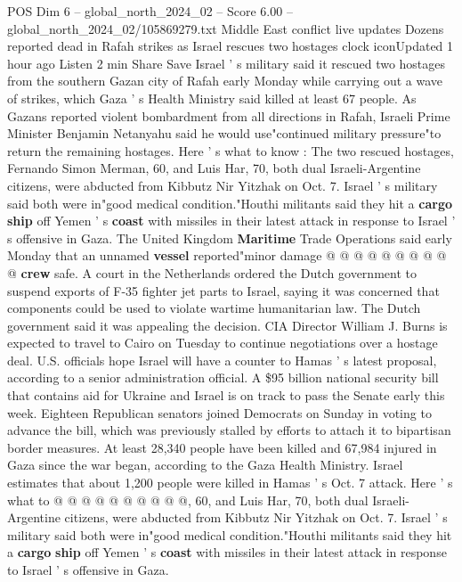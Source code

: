 \begin{textsample}{POS Dim 6 – global\_north\_2024\_02 – Score 6.00 – global\_north\_2024\_02/105869279.txt}  \label{ex:f6_pos_179}
Middle East conflict live updates Dozens reported dead in Rafah strikes as Israel rescues two hostages clock iconUpdated 1 hour ago Listen 2 min Share Save Israel ' s military said it rescued two hostages from the southern Gazan city of Rafah early Monday while carrying out a wave of strikes, which Gaza ' s Health Ministry said killed at least 67 people.
As Gazans reported violent bombardment from all directions in Rafah, Israeli Prime Minister Benjamin Netanyahu said he would use"continued military pressure"to return the remaining hostages.
Here ' s what to know : The two rescued hostages, Fernando Simon Merman, 60, and Luis Har, 70, both dual Israeli-Argentine citizens, were abducted from Kibbutz Nir Yitzhak on Oct. 7.
Israel ' s military said both were in"good medical condition."Houthi militants said they hit a \textbf{cargo} \textbf{ship} off Yemen ' s \textbf{coast} with missiles in their latest attack in response to Israel ' s offensive in Gaza.
The United Kingdom \textbf{Maritime} Trade Operations said early Monday that an unnamed \textbf{vessel} reported"minor damage @ @ @ @ @ @ @ @ @ @ \textbf{crew} safe.
A court in the Netherlands ordered the Dutch government to suspend exports of F-35 fighter jet parts to Israel, saying it was concerned that components could be used to violate wartime humanitarian law.
The Dutch government said it was appealing the decision.
CIA Director William J.
Burns is expected to travel to Cairo on Tuesday to continue negotiations over a hostage deal.
U.S. officials hope Israel will have a counter to Hamas ' s latest proposal, according to a senior administration official.
A \$95 billion national security bill that contains aid for Ukraine and Israel is on track to pass the Senate early this week.
Eighteen Republican senators joined Democrats on Sunday in voting to advance the bill, which was previously stalled by efforts to attach it to bipartisan border measures.
At least 28,340 people have been killed and 67,984 injured in Gaza since the war began, according to the Gaza Health Ministry.
Israel estimates that about 1,200 people were killed in Hamas ' s Oct. 7 attack.
Here ' s what to @ @ @ @ @ @ @ @ @ @, 60, and Luis Har, 70, both dual Israeli-Argentine citizens, were abducted from Kibbutz Nir Yitzhak on Oct. 7.
Israel ' s military said both were in"good medical condition."Houthi militants said they hit a \textbf{cargo} \textbf{ship} off Yemen ' s \textbf{coast} with missiles in their latest attack in response to Israel ' s offensive in Gaza.

\end{textsample}
